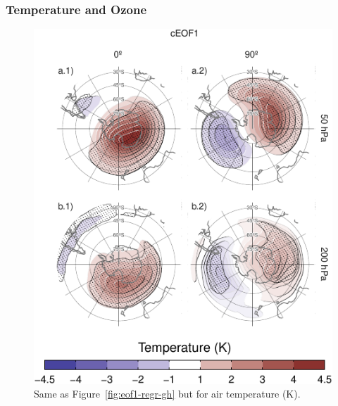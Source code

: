 \documentclass[pdflatex,sn-basic]{sn-jnl}
\theoremstyle{thmstyleone}%
\theoremstyle{thmstyletwo}%
\theoremstyle{thmstylethree}%
\begin{document}
\hypertarget{temp-ozone}{%
\subsubsection{Temperature and Ozone}\label{temp-ozone}}



\begin{figure}
\centering
\includegraphics{../figures/eof1-regr-t-1.pdf}
\caption{\label{fig:eof1-regr-t}Same as Figure~\ref{fig:eof1-regr-gh} but for air temperature (K).}
\end{figure}
\end{document}

